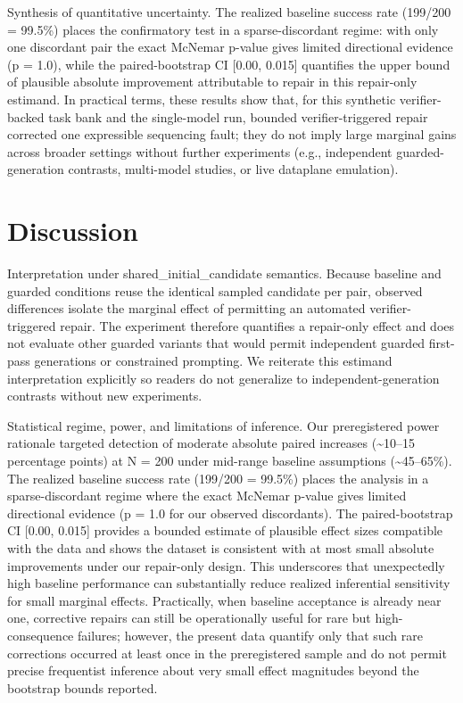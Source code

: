\documentclass[conference]{IEEEtran}
\begin{document}
Synthesis of quantitative uncertainty. The realized baseline success rate (199/200 = 99.5\%) places the confirmatory test in a sparse-discordant regime: with only one discordant pair the exact McNemar p-value gives limited directional evidence (p = 1.0), while the paired-bootstrap CI [0.00, 0.015] quantifies the upper bound of plausible absolute improvement attributable to repair in this repair-only estimand. In practical terms, these results show that, for this synthetic verifier-backed task bank and the single-model run, bounded verifier-triggered repair corrected one expressible sequencing fault; they do not imply large marginal gains across broader settings without further experiments (e.g., independent guarded-generation contrasts, multi-model studies, or live dataplane emulation).

\section{Discussion}
Interpretation under shared\_initial\_candidate semantics. Because baseline and guarded conditions reuse the identical sampled candidate per pair, observed differences isolate the marginal effect of permitting an automated verifier-triggered repair. The experiment therefore quantifies a repair-only effect and does not evaluate other guarded variants that would permit independent guarded first-pass generations or constrained prompting. We reiterate this estimand interpretation explicitly so readers do not generalize to independent-generation contrasts without new experiments.

Statistical regime, power, and limitations of inference. Our preregistered power rationale targeted detection of moderate absolute paired increases (\textasciitilde{}10--15 percentage points) at N = 200 under mid-range baseline assumptions (\textasciitilde{}45--65\%). The realized baseline success rate (199/200 = 99.5\%) places the analysis in a sparse-discordant regime where the exact McNemar p-value gives limited directional evidence (p = 1.0 for our observed discordants). The paired-bootstrap CI [0.00, 0.015] provides a bounded estimate of plausible effect sizes compatible with the data and shows the dataset is consistent with at most small absolute improvements under our repair-only design. This underscores that unexpectedly high baseline performance can substantially reduce realized inferential sensitivity for small marginal effects. Practically, when baseline acceptance is already near one, corrective repairs can still be operationally useful for rare but high-consequence failures; however, the present data quantify only that such rare corrections occurred at least once in the preregistered sample and do not permit precise frequentist inference about very small effect magnitudes beyond the bootstrap bounds reported.
\end{document}
